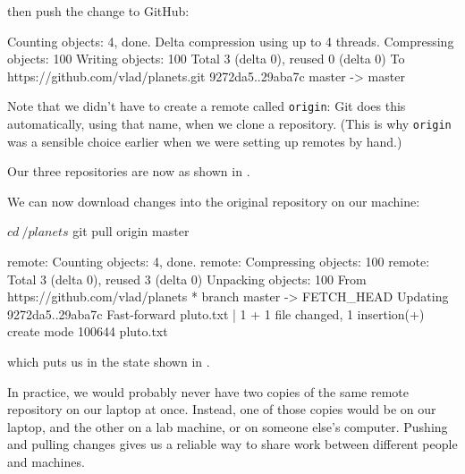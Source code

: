 \documentclass{book}
\begin{document}
then push the change to GitHub:


\begin{VerbOut}
Counting objects: 4, done.
Delta compression using up to 4 threads.
Compressing objects: 100%
Writing objects: 100%
Total 3 (delta 0), reused 0 (delta 0)
To https://github.com/vlad/planets.git
   9272da5..29aba7c  master -> master
\end{VerbOut}

Note that we didn't have to create a remote called \texttt{origin}: Git
does this automatically, using that name, when we clone a repository.
(This is why \texttt{origin} was a sensible choice earlier when we were
setting up remotes by hand.)

Our three repositories are now as shown in .


We can now download changes into the original repository on our machine:

\begin{VerbIn}
$ cd ~/planets
$ git pull origin master
\end{VerbIn}

\begin{VerbOut}
remote: Counting objects: 4, done.
remote: Compressing objects: 100%
remote: Total 3 (delta 0), reused 3 (delta 0)
Unpacking objects: 100%
From https://github.com/vlad/planets
 * branch            master     -> FETCH_HEAD
Updating 9272da5..29aba7c
Fast-forward
 pluto.txt | 1 +
 1 file changed, 1 insertion(+)
 create mode 100644 pluto.txt
\end{VerbOut}

which puts us in the state shown in .


In practice, we would probably never have two copies of the same remote
repository on our laptop at once. Instead, one of those copies would be
on our laptop, and the other on a lab machine, or on someone else's
computer. Pushing and pulling changes gives us a reliable way to share
work between different people and machines.
\end{document}
